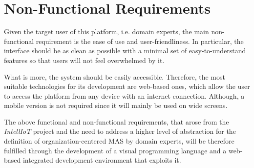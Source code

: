 \section{Non-Functional Requirements}
Given the target user of this platform, i.e. domain experts, the main non-functional requirement is the ease of use and user-friendliness.
In particular, the interface should be as clean as possible with a minimal set of easy-to-understand features so that users will not feel overwhelmed by it.

What is more, the system should be easily accessible.
Therefore, the most suitable technologies for its development are web-based ones, which allow the user to access the platform from any device with an internet connection.
Although, a mobile version is not required since it will mainly be used on wide screens.

The above functional and non-functional requirements, that arose from the \textit{IntellIoT} project and the need to address a higher level of abstraction for the definition of organization-centered MAS by domain experts, will be therefore fulfilled through the development of a visual programming language and a web-based integrated development environment that exploits it.